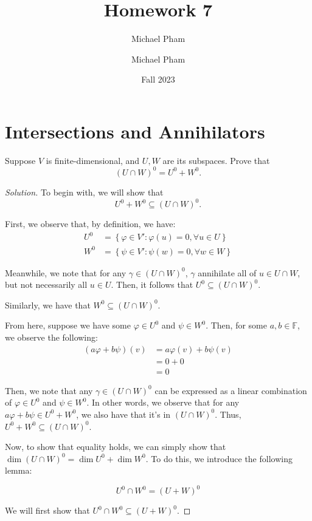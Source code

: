 \documentclass{article}
\title{#1}
\author{Michael Pham}
\date{#2}
\newenvironment{solution}{\begin{proof}[Solution]}{\end{proof}}
\renewcommand\qedsymbol{$\blacksquare$}
\newenvironment{innerproof}{\renewcommand{\qedsymbol}{$\square$}\proof}{\endproof}
\newcommand{\mytitle}[2]{%
	\title{#1}
	\author{Michael Pham}
	\date{#2}
	\maketitle
	\newpage
	\tableofcontents
	\newpage
}
\begin{document}
	\mytitle{Homework 7}{Fall 2023}
	
	\section{Intersections and Annihilators}
	\begin{hw}
		Suppose $V$ is finite-dimensional, and $U,W$ are its subspaces. Prove that
		\begin{equation*}
			(U \cap W)^{0} = U^{0} + W^{0}.
		\end{equation*}
	\end{hw}
	\begin{solution}
		To begin with, we will show that
		\begin{equation*}
			U^{0} + W^{0} \subseteq (U \cap W)^{0}.
		\end{equation*}
		
		First, we observe that, by definition, we have:
		\begin{align*}
			U^{0} &= \left\{  \varphi \in V' : \varphi(u) = 0, \forall u \in U \right\} \\
			W^{0} &= \left\{  \psi\in V' : \psi(w) = 0, \forall w \in W \right\}
		\end{align*}
	
		Meanwhile, we note that for any $\gamma \in (U \cap W)^{0}$, $\gamma$ annihilate all of $u \in U \cap W$, but not necessarily all $u \in U$. Then, it follows that $U^{0} \subseteq (U \cap W)^{0}$.
		
		Similarly, we have that $W^{0} \subseteq (U \cap W)^{0}$.
		
		From here, suppose we have some $\varphi \in U^{0}$ and $\psi \in W^{0}$. Then, for some $a, b \in \mathbb{F}$, we observe the following:
		\begin{align*}
			(a\varphi + b\psi)(v) &= a\varphi(v) + b\psi(v) \\
			&= 0 + 0 \\
			&= 0
		\end{align*}
	
		Then, we note that any $\gamma \in (U \cap W)^{0}$ can be expressed as a linear combination of $\varphi \in U^{0}$ and $\psi \in W^{0}$. In other words, we observe that for any $a\varphi + b\psi \in U^{0} + W^{0}$, we also have that it's in $(U \cap W)^{0}$. Thus, $U^{0} + W^{0} \subseteq (U \cap W)^{0}$.
		
		Now, to show that equality holds, we can simply show that $\dim (U \cap W)^{0} = \dim U^{0} + \dim W^{0}$. To do this, we introduce the following lemma:
		\begin{lem}
			\begin{equation*}
				U^{0} \cap W^{0} = (U + W)^{0}
			\end{equation*}
		\end{lem}
		\begin{innerproof}
			We will first show that $U^{0} \cap W^{0} \subseteq (U + W)^{0}$.
			

\end{innerproof}
\end{solution}
\end{document}
